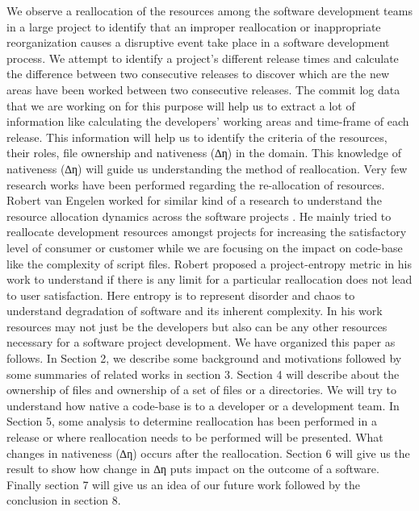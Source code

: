\documentclass{acm_proc_article-sp}
\begin{document}
We observe a reallocation of the resources among the software development teams in a large project to identify that an improper reallocation or inappropriate reorganization causes a disruptive event take place in a software development process. We attempt to identify a project’s different release times and calculate the difference between two consecutive releases to discover which are the new areas have been worked between two consecutive releases. The commit log data that we are working on for this purpose will help us to extract a lot of information like calculating the developers' working areas and time-frame of each release. This information will help us to identify the criteria of the resources, their roles, file ownership and nativeness (∆ƞ) in the domain. This knowledge of nativeness (∆ƞ) will guide us understanding the method of reallocation.
Very few research works have been performed regarding the re-allocation of resources.  Robert van Engelen worked for similar kind of a research to understand the resource allocation dynamics across the software projects \cite{2_datta}. He mainly tried to reallocate development resources amongst projects for increasing the satisfactory level of consumer or customer while we are focusing on the impact on code-base like the complexity of script files. Robert proposed a project-entropy metric in his work to understand if there is any limit for a particular reallocation does not lead to user satisfaction. Here entropy is to represent disorder and chaos to understand degradation of software and its inherent complexity. In his work resources may not just be the developers but also can be any other resources necessary for a software project development.
We have organized this paper as follows. In Section 2, we describe some background and motivations followed by some summaries of related works in section 3. Section 4 will describe about the ownership of files and ownership of a set of files or a directories. We will try to understand how native a code-base is to a developer or a development team. In Section 5, some analysis to determine reallocation has been performed in a release or where reallocation needs to be performed will be presented. What changes in nativeness (∆ƞ) occurs after the reallocation. Section 6 will give us the result to show how change in ∆ƞ puts impact on the outcome of a software. Finally section 7 will give us an idea of our future work followed by the conclusion in section 8.
\end{document}
